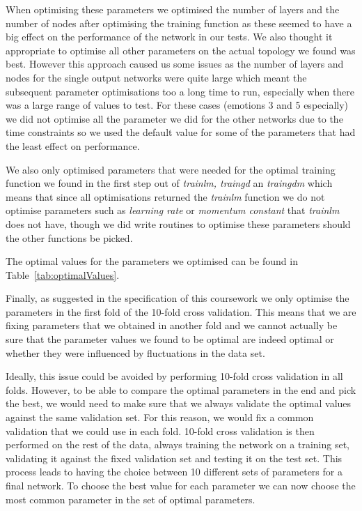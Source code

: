 \documentclass[10pt,a4paper]{article}
\begin{document}
When optimising these parameters we optimised the number of layers and the number of nodes after optimising the training function as these seemed to have a big effect on the performance of the network in our tests. We also thought it appropriate to optimise all other parameters on the actual topology we found was best. However this approach caused us some issues as the number of layers and nodes for the single output networks were quite large which meant the subsequent parameter optimisations too a long time to run, especially when there was a large range of values to test. For these cases (emotions 3 and 5 especially) we did not optimise all the parameter we did for the other networks due to the time constraints so we used the default value for some of the parameters that had the least effect on performance.   

We also only optimised parameters that were needed for the optimal training function we found in the first step out of \emph{trainlm, traingd} an \emph{traingdm} which means that since all optimisations returned the \emph{trainlm} function we do not optimise parameters such as \emph{learning rate} or \emph{momentum constant} that \emph{trainlm} does not have, though we did write routines to optimise these parameters should the other functions be picked.

The optimal values for the parameters we optimised can be found in Table~\ref{tab:optimalValues}.

Finally, as suggested in the specification of this coursework we only optimise the parameters in the first fold of the 10-fold cross validation. This means that we are fixing parameters that we obtained in another fold and we cannot actually be sure that the parameter values we found to be optimal are indeed optimal or whether they were influenced by fluctuations in the data set.

Ideally, this issue could be avoided by performing 10-fold cross validation in all folds. However, to be able to compare the optimal parameters in the end and pick the best, we would need to make sure that we always validate the optimal values against the same validation set. For this reason, we would fix a common validation that we could use in each fold. 10-fold cross validation is then performed on the rest of the data, always training the network on a training set, validating it against the fixed validation set and testing it on the test set. This process leads to having the choice between 10 different sets of parameters for a final network. To choose the best value for each parameter we can now choose the most common parameter in the set of optimal parameters.
\end{document}
